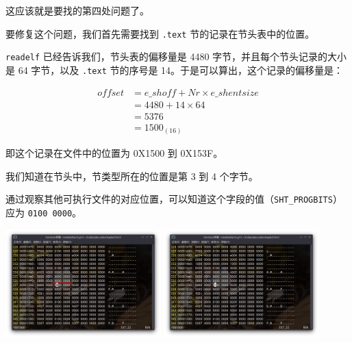 \documentclass{ctexbeamer}
\begin{document}
    \begin{frame}[fragile]
    
        这应该就是要找的第四处问题了。

        要修复这个问题，我们首先需要找到 \texttt{.text} 节的记录在节头表中的位置。\pause

        \texttt{readelf} 已经告诉我们，节头表的偏移量是 4480 字节，并且每个节头记录的大小是 64 字节，以及 \texttt{.text} 节的序号是 14。于是可以算出，这个记录的偏移量是：

        \begin{align*}
            offset &= e\_shoff + Nr \times e\_shentsize \\
            &= 4480 + 14 \times 64 \\
            &= 5376 \\
            &= \mathrm{1500_{(16)}}
        \end{align*}

        即这个记录在文件中的位置为 0X1500 到 0X153F。
    
    \end{frame}

    \begin{frame}[fragile]
    
        我们知道在节头中，节类型所在的位置是第 3 到 4 个字节。

        通过观察其他可执行文件的对应位置，可以知道这个字段的值（\texttt{SHT_PROGBITS}）应为 \texttt{0100 0000}。

        \begin{center}
            \includegraphics[width=0.45\textwidth]{pics/lvl3-error4-before.png}\;
            \includegraphics[width=0.45\textwidth]{pics/lvl3-error4-after.png}
        \end{center}
    
    \end{frame}
\end{document}
